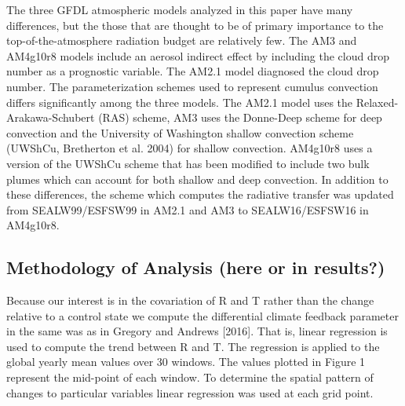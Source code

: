 \documentclass[grl]{agutex2015}
\begin{document}
\begin{article}
        The three GFDL atmospheric models analyzed in this paper have many differences, but the those that are thought to be of primary importance to the top-of-the-atmosphere radiation budget are relatively few.  The AM3 and AM4g10r8 models include an aerosol indirect effect by including the cloud drop number as a prognostic variable.  The AM2.1 model diagnosed the cloud drop number.  The parameterization schemes used to represent cumulus convection differs significantly among the three models.  The AM2.1 model uses the Relaxed-Arakawa-Schubert (RAS) scheme, AM3 uses the Donne-Deep scheme for deep convection and the University of Washington shallow convection scheme (UWShCu, Bretherton et al. 2004) for shallow convection.  AM4g10r8 uses a version of the UWShCu scheme that has been modified to include two bulk plumes which can account for both shallow and deep convection.  In addition to these differences, the scheme which computes the radiative transfer was updated from SEALW99/ESFSW99 in AM2.1 and AM3 to SEALW16/ESFSW16 in AM4g10r8.    
        
\subsection{Methodology of Analysis (here or in results?)}        
            Because our interest is in the covariation of R and T rather than the change relative to a control state we compute the differential climate feedback parameter in the same was as in Gregory and Andrews [2016].  That is, linear regression is used to compute the trend between R and T.  The regression is applied to the global yearly mean values over 30 windows.  The values plotted in Figure 1 represent the mid-point of each window.  
            To determine the spatial pattern of changes to particular variables linear regression was used at each grid point.              
            

\end{article}
\end{document}
